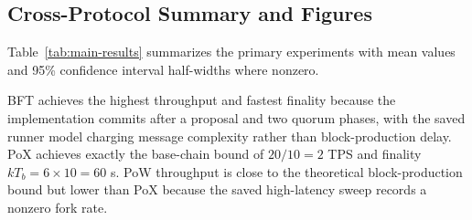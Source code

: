 \documentclass[11pt]{article}
\begin{document}
\begin{table}[t]
\centering
\caption{Auxiliary saved trial results.}
\label{tab:aux-trials}
\end{table}

\subsection{Cross-Protocol Summary and Figures}

Table~\ref{tab:main-results} summarizes the primary experiments with mean values and 95\% confidence interval half-widths where nonzero.

\begin{table}[t]
\centering
\caption{Primary cross-protocol summary.}
\label{tab:main-results}
\end{table}

BFT achieves the highest throughput and fastest finality because the implementation commits after a proposal and two quorum phases, with the saved runner model charging message complexity rather than block-production delay. PoX achieves exactly the base-chain bound of $20/10=2$ TPS and finality $kT_b=6 \times 10=60$ s. PoW throughput is close to the theoretical block-production bound but lower than PoX because the saved high-latency sweep records a nonzero fork rate.
\end{document}
